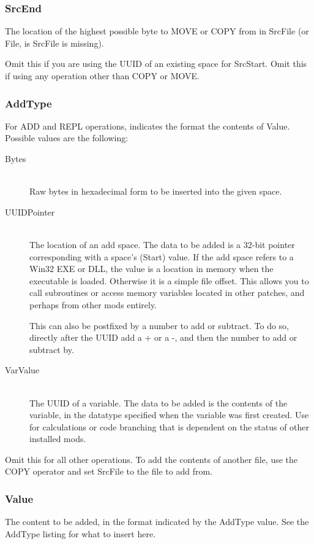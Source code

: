 \documentclass[12pt,a4paper,notitlepage]{article}
\begin{document}
\subsubsection{SrcEnd}
The location of the highest possible byte to MOVE or COPY from in SrcFile (or File, is SrcFile is missing).

Omit this if you are using the UUID of an existing space for SrcStart. Omit this if using any operation other than COPY or MOVE.

\subsubsection{AddType}
For ADD and REPL operations, indicates the format the contents of Value. Possible values are the following:

\begin{description}
\item[Bytes] \hfill \\ 
	Raw bytes in hexadecimal form to be inserted into the given space.
\item[UUIDPointer] \hfill \\
	The location of an add space. The data to be added is a 32-bit pointer corresponding with a space's (Start) value. If the add space refers to a Win32 EXE or DLL, the value is a location in memory when the executable is loaded. Otherwise it is a simple file offset. This allows you to call subroutines or access memory variables located in other patches, and perhaps from other mods entirely.
	
	This can also be postfixed by a number to add or subtract. To do so, directly after the UUID add a + or a -, and then the number to add or subtract by.
\item[VarValue] \hfill \\
	The UUID of a variable. The data to be added is the contents of the variable, in the datatype specified when the variable was first created. Use for calculations or code branching that is dependent on the status of other installed mods.
\end{description}

Omit this for all other operations. To add the contents of another file, use the COPY operator and set SrcFile to the file to add from.

\subsubsection{Value}
The content to be added, in the format indicated by the AddType value. See the AddType listing for what to insert here.
\end{document}

